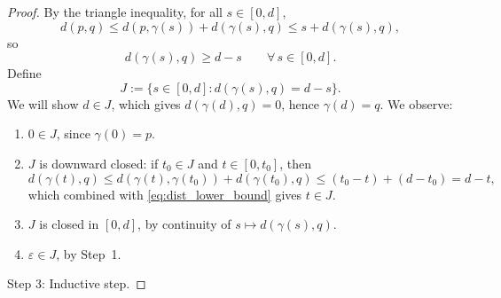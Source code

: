 \begin{proof}
By the triangle inequality, for all $s \in [0,d]$,
\[
d(p,q) \leqslant d(p, \gamma(s)) + d(\gamma(s), q) \leqslant s + d(\gamma(s), q),
\]
so
\begin{equation}\label{eq:dist_lower_bound}
d(\gamma(s), q) \geqslant d - s \qquad \forall\, s \in [0,d].
\end{equation}
Define
\[
J := \{s \in [0,d] : d(\gamma(s), q) = d - s\}.
\]
We will show $d \in J$, which gives $d(\gamma(d), q) = 0$, hence $\gamma(d) = q$. We observe:
\begin{enumerate}
\item $0 \in J$, since $\gamma(0) = p$.
\item $J$ is downward closed: if $t_0 \in J$ and $t \in [0, t_0]$, then 
\[
d(\gamma(t), q) \leqslant d(\gamma(t), \gamma(t_0)) + d(\gamma(t_0), q) \leqslant (t_0 - t) + (d - t_0) = d - t,
\]
which combined with \eqref{eq:dist_lower_bound} gives $t \in J$.
\item $J$ is closed in $[0,d]$, by continuity of $s \mapsto d(\gamma(s), q)$.
\item $\varepsilon \in J$, by Step~1.\\
\end{enumerate}
 
Step 3: Inductive step.


\end{proof}

